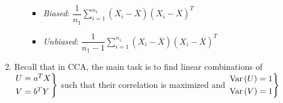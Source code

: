 \begin{enumerate}[label=\arabic*.,leftmargin=*]
\begin{enumerate}[label=\alph*),leftmargin=*]
        \begin{itemize}
          \item\textit{Biased}: $\dfrac{1}{n_1}\sum_{i=1}^{n_1}(X_i-\overline{X})(X_i-\overline{X})^T$
          \item\textit{Unbiased}: $\dfrac{1}{n_1-1}\sum_{i=1}^{n_1}(X_i-\overline{X})(X_i-\overline{X})^T$
        \end{itemize}
    \end{enumerate}
    \par\bigskip
  \item Recall that in CCA, the main task is to find linear combinations of $\begin{rcases*}U = a^TX\\V=b^TY\end{rcases*}$ such that their correlation is maximized and $\begin{rcases*}\text{Var}\left(U\right)=1\\\text{Var}\left(V\right)=1\end{rcases*}$ 
\end{enumerate}
